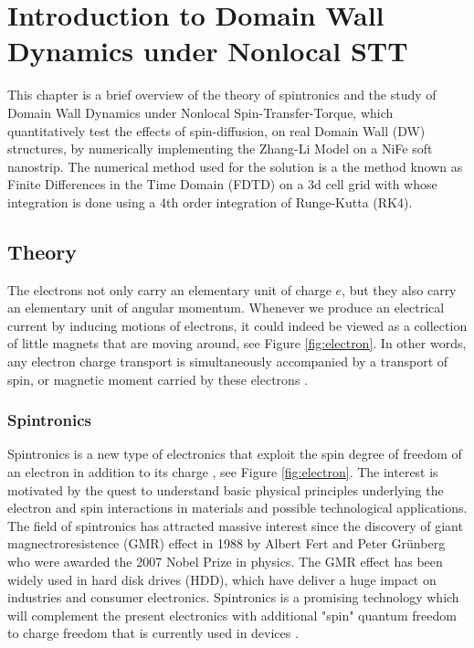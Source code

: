 
\chapter{Introduction to Domain Wall Dynamics under Nonlocal STT} %

\label{Introduction to Domain Wall Dynamics under Nonlocal STT} %



This chapter is a brief overview of the theory of spintronics and the study of Domain Wall Dynamics under Nonlocal Spin-Transfer-Torque, which quantitatively test the effects of spin-diffusion, on real Domain Wall (DW) structures, by numerically implementing the Zhang-Li Model on a NiFe soft nanostrip. The numerical method used for the solution is a the method known as Finite Differences in the Time Domain (FDTD) on a 3d cell grid with whose integration is done using a 4th order integration of Runge-Kutta (RK4).

\section{Theory}

 The electrons not only carry an elementary unit of charge $e$, but they also carry an elementary unit of angular momentum. Whenever we produce an electrical current by inducing motions of electrons, it could indeed be viewed as a collection of little magnets that are moving around, see Figure \ref{fig:electron}. In other words, any electron charge transport is simultaneously accompanied by a transport of spin, or magnetic moment carried by these electrons \cite{cornell}.

\subsection{Spintronics}

Spintronics is a new type of electronics that exploit the spin degree of freedom of an electron in addition to its charge \cite{spinz},  see Figure \ref{fig:electron}. The interest is motivated by the quest to understand basic physical principles underlying the electron and spin interactions in materials and possible technological applications. The field of spintronics has attracted massive interest since the discovery of giant magnectroresistence (GMR) effect in 1988 by Albert Fert and Peter Gr\"{u}nberg who were awarded the 2007 Nobel Prize in physics. The GMR effect has been widely used in hard disk drives (HDD), which have deliver a huge impact on industries and consumer electronics. Spintronics is a promising technology which will complement the present electronics with additional "spin" quantum freedom to charge freedom that is currently used in devices \cite{nonlocalspin}.

